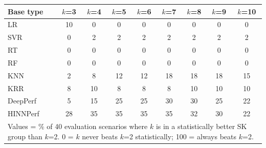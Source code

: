 \begin{tabular}{lcccccccc}
\toprule
Base type & $k$=3 & $k$=4 & $k$=5 & $k$=6 & $k$=7 & $k$=8 & $k$=9 & $k$=10 \\
\midrule
LR & 10 & 0 & 0 & 0 & 0 & 0 & 0 & 0 \\
SVR & 0 & 2 & 2 & 2 & 2 & 2 & 2 & 2 \\
RT & 0 & 0 & 0 & 0 & 0 & 0 & 0 & 0 \\
RF & 0 & 0 & 0 & 0 & 0 & 0 & 0 & 0 \\
KNN & 2 & 8 & 12 & 12 & 18 & 18 & 18 & 15 \\
KRR & 8 & 10 & 8 & 8 & 8 & 10 & 10 & 10 \\
DeepPerf & 5 & 15 & 25 & 25 & 30 & 30 & 25 & 22 \\
HINNPerf & 28 & 35 & 35 & 35 & 35 & 32 & 30 & 22 \\
\bottomrule
\multicolumn{9}{l}{\footnotesize Values = \% of 40 evaluation scenarios where $k$ is in a statistically better SK group than $k$=2. 0 = $k$ never beats $k$=2 statistically; 100 = always beats $k$=2.}} \\
\end{tabular}
